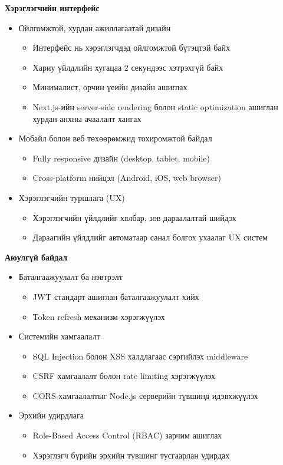 \textbf{Хэрэглэгчийн интерфейс}
\begin{itemize}
    \item Ойлгомжтой, хурдан ажиллагаатай дизайн
    \begin{itemize}
        \item Интерфейс нь хэрэглэгчдэд ойлгомжтой бүтэцтэй байх
        \item Хариу үйлдлийн хугацаа 2 секундээс хэтрэхгүй байх
        \item Минималист, орчин үеийн дизайн ашиглах
        \item Next.js-ийн server-side rendering болон static optimization ашиглан хурдан анхны ачаалалт хангах
    \end{itemize}
    \item Мобайл болон веб төхөөрөмжид тохиромжтой байдал
    \begin{itemize}
        \item Fully responsive дизайн (desktop, tablet, mobile)
        \item Cross-platform нийцэл (Android, iOS, web browser)
    \end{itemize}
    \item Хэрэглэгчийн туршлага (UX)
    \begin{itemize}
        \item Хэрэглэгчийн үйлдлийг хялбар, зөв дараалалтай шийдэх
        \item Дараагийн үйлдлийг автоматаар санал болгох ухаалаг UX систем
    \end{itemize}
\end{itemize}

\textbf{Аюулгүй байдал}
\begin{itemize}
    \item Баталгаажуулалт ба нэвтрэлт
    \begin{itemize}
        \item JWT стандарт ашиглан баталгаажуулалт хийх
        \item Token refresh механизм хэрэгжүүлэх
    \end{itemize}
    \item Системийн хамгаалалт
    \begin{itemize}
        \item SQL Injection болон XSS халдлагаас сэргийлэх
        middleware
        \item CSRF хамгаалалт болон rate limiting хэрэгжүүлэх
        \item CORS хамгаалалтыг Node.js серверийн түвшинд
        идэвхжүүлэх
    \end{itemize}
    \item Эрхийн удирдлага
    \begin{itemize}
        \item Role-Based Access Control (RBAC) зарчим ашиглах
        \item Хэрэглэгч бүрийн эрхийн түвшинг тусгаарлан удирдах
    \end{itemize}
\end{itemize}

